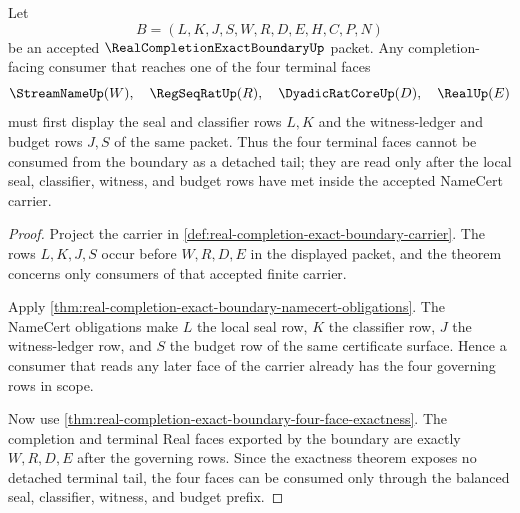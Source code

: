 \begin{theorem}
\label{thm:real-completion-exact-boundary-seal-classifier-witness-balance}
Let
$$
B=(L,K,J,S,W,R,D,E,H,C,P,N)
$$
be an accepted $\RealCompletionExactBoundaryUp$ packet. Any completion-facing consumer that reaches one of the four terminal faces
$$
\StreamNameUp(W),\quad \RegSeqRatUp(R),\quad \DyadicRatCoreUp(D),\quad \RealUp(E)
$$
must first display the seal and classifier rows $L,K$ and the witness-ledger and budget rows $J,S$ of the same packet. Thus the four terminal faces cannot be consumed from the boundary as a detached tail; they are read only after the local seal, classifier, witness, and budget rows have met inside the accepted NameCert carrier.
\end{theorem}
\begin{proof}
Project the carrier in \autoref{def:real-completion-exact-boundary-carrier}. The rows $L,K,J,S$ occur before $W,R,D,E$ in the displayed packet, and the theorem concerns only consumers of that accepted finite carrier.

Apply \autoref{thm:real-completion-exact-boundary-namecert-obligations}. The NameCert obligations make $L$ the local seal row, $K$ the classifier row, $J$ the witness-ledger row, and $S$ the budget row of the same certificate surface. Hence a consumer that reads any later face of the carrier already has the four governing rows in scope.

Now use \autoref{thm:real-completion-exact-boundary-four-face-exactness}. The completion and terminal Real faces exported by the boundary are exactly $W,R,D,E$ after the governing rows. Since the exactness theorem exposes no detached terminal tail, the four faces can be consumed only through the balanced seal, classifier, witness, and budget prefix.
\end{proof}

